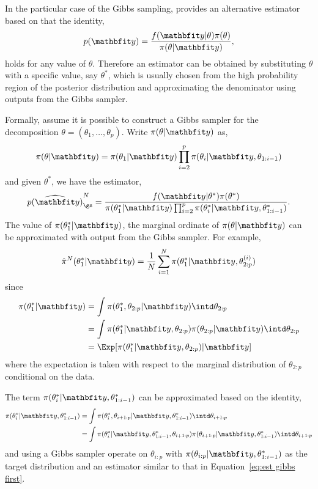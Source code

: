 In the particular case of the Gibbs sampling, \cite{Chib:1995em} provides an
alternative estimator based on that the identity,
\begin{equation}
  p(\data) = \frac{f(\data|\theta)\pi(\theta)}{\pi(\theta|\data)},
\end{equation}
holds for any value of $\theta$. Therefore an estimator can be obtained by
substituting $\theta$ with a specific value, say $\theta^*$, which is usually
chosen from the high probability region of the posterior distribution and
approximating the denominator using outputs from the Gibbs sampler.

Formally, assume it is possible to construct a Gibbs sampler for the
decomposition $\theta = (\theta_1,\dots,\theta_p)$. Write $\pi(\theta|\data)$
as,
\begin{equation}
  \pi(\theta|\data) = \pi(\theta_1|\data)
  \prod_{i=2}^p\pi(\theta_i|\data,\theta_{1:i-1})
\end{equation}
and given $\theta^*$, we have the estimator,
\begin{equation}
  \widehat{p(\data)}_{\gs}^N = \frac{f(\data|\theta^*)\pi(\theta^*)}
  {\pi(\theta_1^*|\data)
    \prod_{i=2}^p\pi(\theta_i^*|\data,\theta_{1:i-1}^*)}.
\end{equation}
The value of $\pi(\theta_1^*|\data)$, the marginal ordinate of
$\pi(\theta|\data)$ can be approximated with output from the Gibbs sampler.
For example,
\begin{equation}
  \hat\pi^N(\theta_1^*|\data)
  = \frac{1}{N}\sum_{i=1}^N \pi(\theta_1^*|\data,\theta_{2:p}^{(i)})
  \label{eq:est gibbs first}
\end{equation}
since
\begin{align*}
  \pi(\theta_1^*|\data)
  &= \int\pi(\theta_1^*, \theta_{2:p}|\data)\intd\theta_{2:p} \\
  &= \int\pi(\theta_1^*|\data,\theta_{2:p})
  \pi(\theta_{2:p}|\data)\intd\theta_{2:p} \\
  &= \Exp[\pi(\theta_1^*|\data,\theta_{2:p})|\data]
\end{align*}
where the expectation is taken with respect to the marginal distribution of
$\theta_{2:p}$ conditional on the data.

The term $\pi(\theta_i^*|\data,\theta_{1:i-1}^*)$ can be approximated based on
the identity,
\begin{align}
  \pi(\theta_i^*|\data,\theta_{1:i-1}^*)
  &= \int \pi(\theta_i^*,\theta_{i+1:p}|\data,\theta_{1:i-1}^*)
  \intd\theta_{i+1:p} \notag\\
  &= \int \pi(\theta_i^*|\data,\theta_{1:i-1}^*,\theta_{i+1:p})
  \pi(\theta_{i+1:p}|\data,\theta_{1:i-1}^*) \intd\theta_{i+1:p}
\end{align}
and using a Gibbs sampler operate on $\theta_{i:p}$ with
$\pi(\theta_{i:p}|\data,\theta_{1:i-1}^*)$ as the target distribution and an
estimator similar to that in Equation~\eqref{eq:est gibbs first}.

